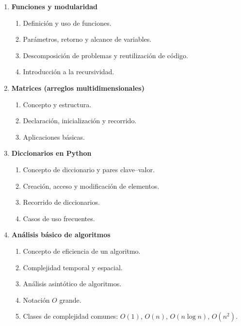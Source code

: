 \begin{enumerate}
  \item \textbf{Funciones y modularidad}

  \begin{enumerate}
    \item \label{itm:8.1} Definición y uso de funciones.
    \item \label{itm:8.2} Parámetros, retorno y alcance de variables.
    \item \label{itm:8.3} Descomposición de problemas y reutilización de código.
    \item \label{itm:8.4} Introducción a la recursividad.
  \end{enumerate}

  \item \textbf{Matrices (arreglos multidimensionales)}

  \begin{enumerate}
    \item \label{itm:9.1} Concepto y estructura.
    \item \label{itm:9.2} Declaración, inicialización y recorrido.
    \item \label{itm:9.3} Aplicaciones básicas.
  \end{enumerate}

  \item \textbf{Diccionarios en Python}

  \begin{enumerate}
    \item \label{itm:10.1} Concepto de diccionario y pares clave--valor.
    \item \label{itm:10.2} Creación, acceso y modificación de elementos.
    \item \label{itm:10.3} Recorrido de diccionarios.
    \item \label{itm:10.4} Casos de uso frecuentes.
  \end{enumerate}

  \item \textbf{Análisis básico de algoritmos}

  \begin{enumerate}
    \item \label{itm:11.1} Concepto de eficiencia de un algoritmo.
    \item \label{itm:11.2} Complejidad temporal y espacial.
    \item \label{itm:11.3} Análisis asintótico de algoritmos.
    \item \label{itm:11.4} Notación $O$ grande.
    \item \label{itm:11.5} Clases de complejidad comunes: $O(1)$, $O(n)$, $O(n \log n)$, $O(n^2)$.
  \end{enumerate}


\end{enumerate}
